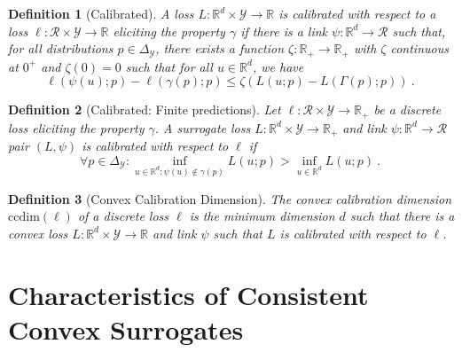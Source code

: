 \documentclass{article}
\newcommand{\reals}{\mathbb{R}}
\newcommand{\simplex}{\Delta_\Y}
\newcommand{\ccdim}{\mathrm{ccdim}}
\newcommand{\R}{\mathcal{R}}
\newcommand{\Y}{\mathcal{Y}}
\newtheorem{definition}{Definition}
\begin{document}
\begin{definition}[Calibrated]\label{def:calibrated-general}
	A loss $L:\reals^d \times \Y \to \reals$ is \emph{calibrated} with respect to a loss $\ell : \R \times \Y \to \reals$ eliciting the property $\gamma$ if there is a link $\psi : \reals^d \to \R$ such that, for all distributions $p \in \simplex$, there exists a function $\zeta : \reals_+ \to \reals_+$ with $\zeta$ continuous at $0^+$ and $\zeta(0) = 0$ such that for all $u \in \reals^d$, we have
	\begin{equation}\label{eq:calibrated-general}
	\ell( \psi(u); p) - \ell(\gamma(p); p)  \leq \zeta \left(  L(u;p) - L(\Gamma(p); p) \right)~.~
	\end{equation}
\end{definition}
\begin{definition}[Calibrated: Finite predictions]\label{def:calibrated-finite}
	Let $\ell : \R \times \Y \to \reals_+$ be a discrete loss eliciting the property $\gamma$.
	A surrogate loss $L : \reals^d \times \Y \to \reals_+$  and link $\psi:\reals^d \to \R$ pair $(L, \psi)$ is \emph{calibrated} with respect to $\ell$ if 
	\begin{equation}\label{eq:calibration}
	\forall p \in \simplex: \inf_{u \in \reals^d : \psi(u) \not \in \gamma(p)} L(u;p) > \inf_{u \in \reals^d} L(u;p)~.~
	\end{equation}
\end{definition}

\begin{definition}[Convex Calibration Dimension]
The \emph{convex calibration dimension} $\ccdim(\ell)$ of a discrete loss $\ell$ is the minimum dimension $d$ such that there is a convex loss $L: \reals^d \times \Y \to \reals$ and link $\psi$ such that $L$ is calibrated with respect to $\ell$.
\end{definition}


\section{Characteristics of Consistent Convex Surrogates}\label{sec:char-convex}
\end{document}
